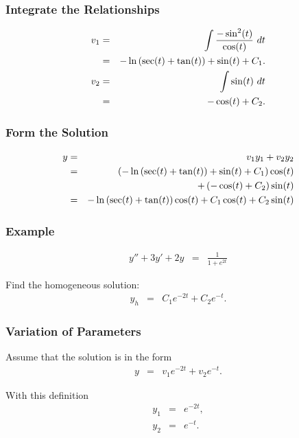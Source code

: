\begin{frame}
  \frametitle{Integrate the Relationships}

  \begin{eqnarray*}
    v_1 & = & \int \frac{-\sin^2(t)}{\cos(t)} ~ dt \\
    & = & -\ln\left(\sec(t)+\tan(t)\right) + \sin(t) + C_1. \\
    v_2 & = & \int \sin(t) ~ dt \\ 
    & = & -\cos(t) + C_2.
  \end{eqnarray*}

\end{frame}


\begin{frame}
  \frametitle{Form the Solution}

  \begin{eqnarray*}
    y & = & v_1 y_1 + v_2 y_2 \\
    & = & \left( -\ln\left(\sec(t)+\tan(t)\right) + \sin(t) + C_1 \right) \cos(t) \\
    & & 
    + \left( -\cos(t) + C_2 \right) \sin(t) \\
    & = & - \ln\left(\sec(t)+\tan(t)\right) \cos(t) + C_1 \cos(t) + C_2 \sin(t)
  \end{eqnarray*}

\end{frame}

\begin{frame}
  \frametitle{Example}
  
  \begin{eqnarray*}
    y'' + 3y' + 2y & = & \frac{1}{1+e^{2t}} 
  \end{eqnarray*}

  {
    Find the homogeneous solution:
    \begin{eqnarray*}
      y_h & = & C_1 e^{-2t} + C_2 e^{-t}.
    \end{eqnarray*}
  }

\end{frame}


\begin{frame}
  \frametitle{Variation of Parameters}

  Assume that the solution is in the form
  \begin{eqnarray*}
    y & = & v_1 e^{-2t} + v_2 e^{-t}.
  \end{eqnarray*}

  With this definition
  \begin{eqnarray*}
    y_1 & = & e^{-2t}, \\
    y_2 & = & e^{-t}.
  \end{eqnarray*}

\end{frame}

